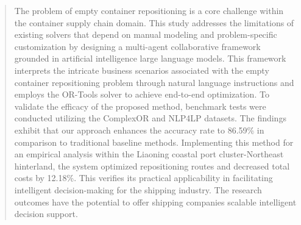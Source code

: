 \documentclass[preprint,12pt]{elsarticle}
\begin{document}
\begin{frontmatter}




\begin{abstract}
The problem of empty container repositioning is a core challenge within the container supply chain domain. This study addresses the limitations of existing solvers that depend on manual modeling and problem-specific customization by designing a multi-agent collaborative framework grounded in artificial intelligence large language models. This framework interprets the intricate business scenarios associated with the empty container repositioning problem through natural language instructions and employs the OR-Tools solver to achieve end-to-end optimization. To validate the efficacy of the proposed method, benchmark tests were conducted utilizing the ComplexOR and NLP4LP datasets. The findings exhibit that our approach enhances the accuracy rate to 86.59\% in comparison to traditional baseline methods. Implementing this method for an empirical analysis within the Liaoning coastal port cluster-Northeast hinterland, the system optimized repositioning routes and decreased total costs by 12.18\%. This verifies its practical applicability in facilitating intelligent decision-making for the shipping industry. The research outcomes have the potential to offer shipping companies scalable intelligent decision support.
\end{abstract}



\end{frontmatter}
\end{document}
